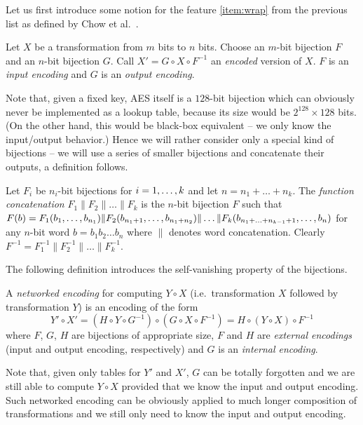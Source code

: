 Let us first introduce some notion for the feature \ref{item:wrap} from the previous list as defined by Chow et al.\ \cite{chow2002aes}.

\begin{defn}[Encoding]
	Let $X$ be a transformation from $m$ bits to $n$ bits. Choose an $m$-bit bijection $F$ and an $n$-bit bijection $G$. Call $X' = G \circ X \circ F^{-1}$ an {\em encoded} version of $X$. $F$ is an {\em input encoding} and $G$ is an {\em output encoding}.
\end{defn}

Note that, given a fixed key, AES itself is a $128$-bit bijection which can obviously never be implemented as a lookup table, because its size would be $2^{128}\times 128$ bits. (On the other hand, this would be black-box equivalent -- we only know the input/output behavior.) Hence we will rather consider only a special kind of bijections -- we will use a series of smaller bijections and concatenate their outputs, a definition follows.

\begin{defn}
\label{def:concat}
	Let $F_i$ be $n_i$-bit bijections for $i=1 , \ldots , k$ and let $n = n_1 + \ldots + n_k$. The {\em function concatenation} $F_1 \| F_2 \| \ldots \| F_k$ is the $n$-bit bijection $F$ such that $F(b) = F_1(b_1 , \ldots , b_{n_1})\| F_2(b_{n_1+1} , \ldots , b_{n_1+n_2})\|\ldots\| F_k(b_{n_1+\ldots+n_{k-1}+1} , \ldots , b_n)$ for any $n$-bit word $b=b_1b_2\ldots b_n$ where $\|$ denotes word concatenation. Clearly $F^{-1} = F_1^{-1}\| F_2^{-1}\| \ldots \|F_k^{-1}$.
\end{defn}

The following definition introduces the self-vanishing property of the bijections.

\begin{defn}
\label{def:netw}
	A {\em networked encoding} for computing $Y\circ X$ (i.e.\ transformation $X$ followed by transformation $Y$) is an encoding of the form
	\[
		Y'\circ X' = (H\circ Y\circ G^{-1})\circ(G\circ X\circ F^{-1}) = H\circ(Y\circ X)\circ F^{-1}
	\]
	where $F$, $G$, $H$ are bijections of appropriate size, $F$ and $H$ are {\em external encodings} (input and output encoding, respectively) and $G$ is an {\em internal encoding}.
\end{defn}

Note that, given only tables for $Y'$ and $X'$, $G$ can be totally forgotten and we are still able to compute $Y\circ X$ provided that we know the input and output encoding. Such networked encoding can be obviously applied to much longer composition of transformations and we still only need to know the input and output encoding.


